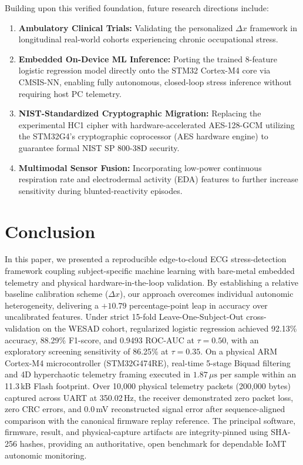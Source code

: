 \documentclass[conference]{IEEEtran}
\begin{document}
Building upon this verified foundation, future research directions include:
\begin{enumerate}
    \item \textbf{Ambulatory Clinical Trials:} Validating the personalized $\Delta x$ framework in longitudinal real-world cohorts experiencing chronic occupational stress.
    \item \textbf{Embedded On-Device ML Inference:} Porting the trained 8-feature logistic regression model directly onto the STM32 Cortex-M4 core via CMSIS-NN, enabling fully autonomous, closed-loop stress inference without requiring host PC telemetry.
    \item \textbf{NIST-Standardized Cryptographic Migration:} Replacing the experimental HC1 cipher with hardware-accelerated AES-128-GCM utilizing the STM32G4's cryptographic coprocessor (AES hardware engine) to guarantee formal NIST SP 800-38D security.
    \item \textbf{Multimodal Sensor Fusion:} Incorporating low-power continuous respiration rate and electrodermal activity (EDA) features to further increase sensitivity during blunted-reactivity episodes.
\end{enumerate}

\section{Conclusion}
\label{sec:conclusion}

In this paper, we presented a reproducible edge-to-cloud ECG stress-detection framework coupling subject-specific machine learning with bare-metal embedded telemetry and physical hardware-in-the-loop validation. By establishing a relative baseline calibration scheme ($\Delta x$), our approach overcomes individual autonomic heterogeneity, delivering a $+10.79$ percentage-point leap in accuracy over uncalibrated features. Under strict 15-fold Leave-One-Subject-Out cross-validation on the WESAD cohort, regularized logistic regression achieved 92.13\% accuracy, 88.29\% F1-score, and 0.9493 ROC-AUC at $\tau = 0.50$, with an exploratory screening sensitivity of 86.25\% at $\tau = 0.35$. On a physical ARM Cortex-M4 microcontroller (STM32G474RE), real-time 5-stage Biquad filtering and 4D hyperchaotic telemetry framing executed in $1.87\,\mu\text{s}$ per sample within an 11.3\,kB Flash footprint. Over 10,000 physical telemetry packets (200,000 bytes) captured across UART at 350.02\,Hz, the receiver demonstrated zero packet loss, zero CRC errors, and 0.0\,mV reconstructed signal error after sequence-aligned comparison with the canonical firmware replay reference. The principal software, firmware, result, and physical-capture artifacts are integrity-pinned using SHA-256 hashes, providing an authoritative, open benchmark for dependable IoMT autonomic monitoring.
\end{document}
